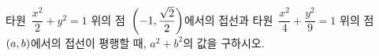 타원~$\dfrac{x^2}{2}+y^2=1$ 위의 점~$\left(-1{,}\mkern3mu\mathopen{}\dfrac{\sqrt{2}}{2}\right)$에서의 접선과 타원~$\dfrac{x^2}{4}+\dfrac{y^2}{9}=1$ 위의 점~$(a{,}\mkern3mu\mathopen{}b)$에서의 접선이 평행할 때, $a^2+b^2$의 값을 구하시오.
